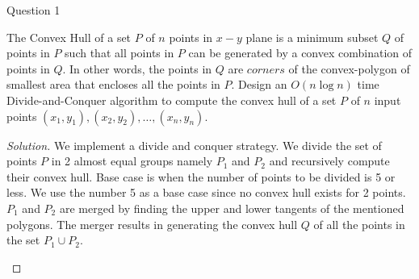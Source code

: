 \begin{solution}{Question 1}\label{ques:1}
    \begin{question}
    The Convex Hull of a set $P$ of $n$ points in $x-y$ plane is a minimum subset $Q$ of points in $P$ such that all points in $P$ can be generated by a convex combination of points in $Q$. In other words, the points in $Q$ are $corners$ of the convex-polygon of smallest area that encloses all the points in $P$. Design an $O(n \log n)$ time Divide-and-Conquer algorithm to compute the convex hull of a set $P$ of $n$ input points ${(x_1, y_1), (x_2, y_2), \ldots, (x_n, y_n)}$.
    \end{question}
    \tcblower{}
    \begin{proof}[Solution]
        We implement a divide and conquer strategy. We divide the set of points $P$ in 2 almost equal groups namely $P_1$ and $P_2$ and recursively compute their convex hull. Base case is when the number of points to be divided is 5 or less. We use the number 5 as a base case since no convex hull exists for 2 points. $P_1$ and $P_2$ are merged by finding the upper and lower tangents of the mentioned polygons. The merger results in generating the convex hull $Q$ of all the points in the set $P_1 \cup P_2$.
        \begin{algorithm}[H]
            \caption{Merge algorithm for divide and conquer solution for convex hull} \label{alg:d_c_c_h_m}
            \begin{algorithmic}[1]
                 
                    \EndIf{}
                 
                    \EndIf{}
                 
                         
                    \EndWhile{}
                         

\end{algorithmic}
\end{algorithm}
\end{proof}
\end{solution}
